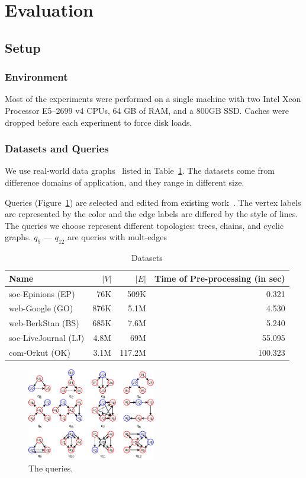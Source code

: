 \section{Evaluation}\label{sec:experiments}
\subsection{Setup}
\subsubsection{Environment}
Most of the experiments were performed on a single machine with two Intel Xeon Processor E5--2699 v4 CPUs, 64 GB of RAM,
and a 800GB SSD\@.
Caches were dropped before each experiment to force disk loads.
\subsubsection{Datasets and Queries}
We use real-world data graphs~\cite{snapnets} listed in Table~\ref{tab:datasets}.
The datasets come from difference domains of application, and they range in different size.

Queries (Figure~\ref{img:queries}) are selected and edited from existing work~\cite{DBLP:conf/cloud/SerafiniMS17,DBLP:journals/pvldb/MhedhbiS19}.
The vertex labels are represented by the color and the edge labels are differed by the style of lines.
The queries we choose represent different topologies: trees, chains, and cyclic graphs.
$q_9$ --- $q_{12}$ are queries with mult-edges
\begin{table}
  \caption{Datasets}\label{tab:datasets}
  \begin{tabular}{lrrr}
    \toprule
    Name & $|V|$ & $|E|$ & \parbox[t][][t]{0.18\linewidth}{Time of Pre-processing (in sec)} \\
    \midrule
    soc-Epinions (EP) & 76K & 509K & 0.321 \\
    web-Google (GO) & 876K & 5.1M & 4.530 \\
    web-BerkStan (BS) & 685K & 7.6M & 5.240 \\
    soc-LiveJournal (LJ) & 4.8M & 69M & 55.095 \\
    com-Orkut (OK) & 3.1M & 117.2M & 100.323 \\
    \bottomrule
  \end{tabular}
\end{table}

\begin{figure}[ht]
  \centering
  \includegraphics[width=0.5\textwidth]{img/queries.pdf}
  \caption{The queries.}\label{img:queries}
\end{figure}

